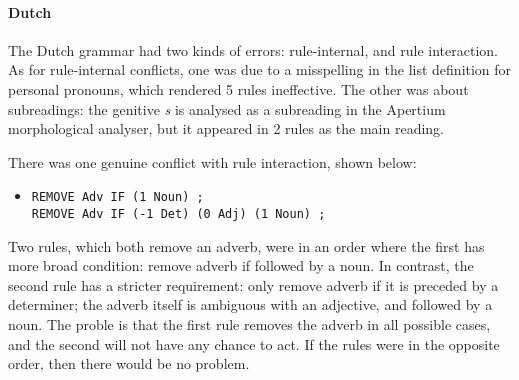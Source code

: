 \paragraph{Dutch} The Dutch grammar had two kinds of errors: rule-internal, and rule interaction. As for rule-internal conflicts, one was due to a misspelling in the list definition for personal pronouns, which rendered 5 rules ineffective. The other was about subreadings: the genitive \emph{s} is analysed as a subreading in the Apertium morphological analyser, but it appeared in 2 rules as the main reading. 

There was one genuine conflict with rule interaction, shown below:

\begin{itemize}
\item[] 
\begin{verbatim}REMOVE Adv IF (1 Noun) ;
REMOVE Adv IF (-1 Det) (0 Adj) (1 Noun) ;
\end{verbatim}
\end{itemize}

Two rules, which both remove an adverb, were in an order where the first has more broad condition: remove adverb if followed by a noun. In contrast, the second rule has a stricter requirement: only remove adverb if it is preceded by a determiner; the adverb itself is ambiguous with an adjective, and followed by a noun. The proble is that the first rule removes the adverb in all possible cases, and the second will not have any chance to act. If the rules were in the opposite order, then there would be no problem.





